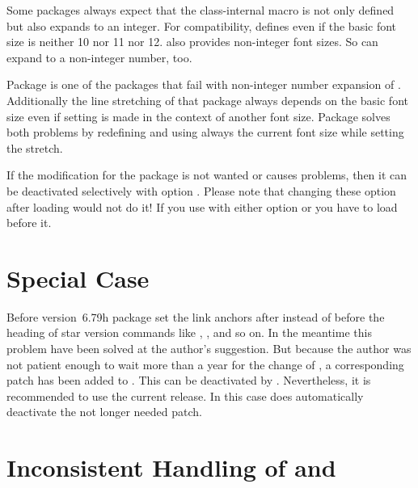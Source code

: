 Some packages always expect that the class-internal macro
 is not only defined but also expands to an
integer. For compatibility, \KOMAScript{} defines  even if the
basic font size is neither 10 nor 11 nor
12. \KOMAScript{} also provides non-integer font sizes. So
 can expand to a non-integer number, too.

Package
 is one of the packages
that fail with non-integer number expansion of . Additionally
the line stretching of that package always depends on the basic font size even
if setting is made in the context of another font size. Package
 solves both problems by redefining 
and  using always the current font size while setting the
stretch.

If the modification for the package is not wanted or causes problems,
then it can be deactivated selectively with option
.
Please note that changing these option after loading
 would not do it! If you use  with
either option  or  you have to
load  before it.


\section{Special Case }

Before version~6.79h package  set the link anchors after
instead of before the heading of star version commands like
, , and so on. In
the meantime this problem have been solved at the \KOMAScript{} author's
suggestion. But because the \KOMAScript{} author was not patient enough to
wait more than a year for the change of , a corresponding
patch has been added to . This can be deactivated by
. Nevertheless, it is recommended to use the
current  release. In this case  does
automatically deactivate the not longer needed patch.%


\section{Inconsistent Handling of  and }

